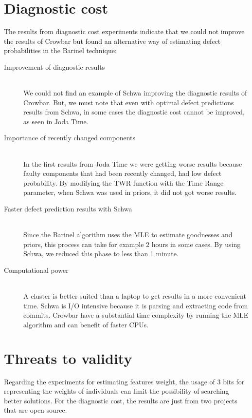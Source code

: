 \section{Diagnostic cost}
The results from diagnostic cost experiments indicate that we could not improve
the results of Crowbar but found an alternative way of estimating defect
probabilities in the Barinel technique:

\begin{description}
\item[Improvement of diagnostic results] \hfill \\
We could not find an example of Schwa improving the diagnostic results of
Crowbar. But, we must note that even with optimal defect predictions results
from Schwa, in some cases the diagnostic cost cannot be improved, as seen in
Joda Time.

\item[Importance of recently changed components] \hfill \\
In the first results from Joda Time we were getting worse results because faulty
components that had been recently changed, had low defect probability. By
modifying the TWR function with the Time Range parameter, when Schwa was used
in priors, it did not got worse results.

\item[Faster defect prediction results with Schwa] \hfill \\
Since the Barinel algorithm uses the MLE to estimate goodnesses and priors, this
process can take for example 2 hours in some cases. By using Schwa, we reduced
this phase to less than 1 minute.

\item[Computational power] \hfill \\
A cluster is better suited than a laptop to get results in a more convenient
time. Schwa is I/O intensive because it is parsing and extracting code from
commits. Crowbar have a substantial time complexity by running the MLE algorithm
and can benefit of faster CPUs.

\end{description}

\section{Threats to validity}
Regarding the experiments for estimating features weight, the usage of 3 bits
for representing the weights of individuals can limit the possibility of
searching better solutions. For the diagnostic cost, the results are just
from two projects that are open source.

